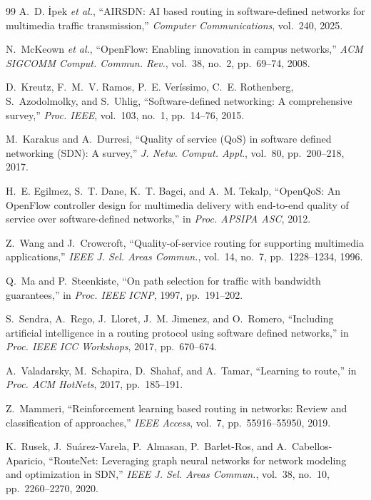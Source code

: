 \documentclass[conference,a4paper]{IEEEtran}
\begin{document}
\begin{thebibliography}{99}
 A.~D. \.{I}pek \textit{et al.}, ``AIRSDN: AI based routing in software-defined networks
for multimedia traffic transmission,'' \textit{Computer Communications}, vol.~240, 2025.

 N.~McKeown \textit{et al.}, ``OpenFlow: Enabling innovation in campus networks,''
\textit{ACM SIGCOMM Comput. Commun. Rev.}, vol.~38, no.~2, pp.~69--74, 2008.

 D.~Kreutz, F.~M.~V. Ramos, P.~E. Ver\'issimo, C.~E. Rothenberg, S.~Azodolmolky, and
S.~Uhlig, ``Software-defined networking: A comprehensive survey,'' \textit{Proc. IEEE}, vol.~103, no.~1,
pp.~14--76, 2015.

 M.~Karakus and A.~Durresi, ``Quality of service (QoS) in software defined networking (SDN):
A survey,'' \textit{J. Netw. Comput. Appl.}, vol.~80, pp.~200--218, 2017.

 H.~E. Egilmez, S.~T. Dane, K.~T. Bagci, and A.~M. Tekalp, ``OpenQoS: An OpenFlow
controller design for multimedia delivery with end-to-end quality of service over software-defined networks,'' in
\textit{Proc. APSIPA ASC}, 2012.

 Z.~Wang and J.~Crowcroft, ``Quality-of-service routing for supporting multimedia
applications,'' \textit{IEEE J. Sel. Areas Commun.}, vol.~14, no.~7, pp.~1228--1234, 1996.

 Q.~Ma and P.~Steenkiste, ``On path selection for traffic with bandwidth guarantees,'' in
\textit{Proc. IEEE ICNP}, 1997, pp.~191--202.

 S.~Sendra, A.~Rego, J.~Lloret, J.~M. Jimenez, and O.~Romero, ``Including artificial
intelligence in a routing protocol using software defined networks,'' in \textit{Proc. IEEE ICC Workshops}, 2017,
pp.~670--674.

 A.~Valadarsky, M.~Schapira, D.~Shahaf, and A.~Tamar, ``Learning to route,'' in
\textit{Proc. ACM HotNets}, 2017, pp.~185--191.

 Z.~Mammeri, ``Reinforcement learning based routing in networks: Review and classification
of approaches,'' \textit{IEEE Access}, vol.~7, pp.~55916--55950, 2019.

 K.~Rusek, J.~Su\'arez-Varela, P.~Almasan, P.~Barlet-Ros, and A.~Cabellos-Aparicio,
``RouteNet: Leveraging graph neural networks for network modeling and optimization in SDN,'' \textit{IEEE J. Sel.
Areas Commun.}, vol.~38, no.~10, pp.~2260--2270, 2020.


\end{thebibliography}
\end{document}
